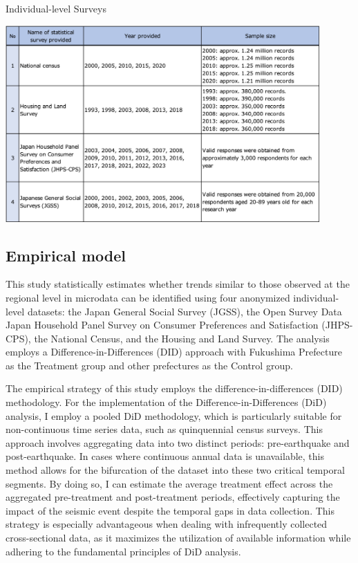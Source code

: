 \documentclass[12pt,halfline,a4paper]{ouparticle}
\begin{document}
\begin{table}[h]
    \centering
    \caption{Individual-level Surveys}
    \label{tab:annual_income}
    \includegraphics[width=0.9\textwidth]{Statistical surveys.png}  %
\end{table}

\subsection{Empirical model}
\label{sec5.1}

This study statistically estimates whether trends similar to those observed at the regional level in microdata can be identified using four anonymized individual-level datasets: the Japan General Social Survey (JGSS), the Open Survey Data Japan Household Panel Survey on Consumer Preferences and Satisfaction (JHPS-CPS), the National Census, and the Housing and Land Survey. The analysis employs a Difference-in-Differences (DID) approach with Fukushima Prefecture as the Treatment group and other prefectures as the Control group.

The empirical strategy of this study employs the difference-in-differences (DID) methodology. For the implementation of the Difference-in-Differences (DiD) analysis, I employ a pooled DiD methodology, which is particularly suitable for non-continuous time series data, such as quinquennial census surveys. This approach involves aggregating data into two distinct periods: pre-earthquake and post-earthquake. In cases where continuous annual data is unavailable, this method allows for the bifurcation of the dataset into these two critical temporal segments. By doing so, I can estimate the average treatment effect across the aggregated pre-treatment and post-treatment periods, effectively capturing the impact of the seismic event despite the temporal gaps in data collection. This strategy is especially advantageous when dealing with infrequently collected cross-sectional data, as it maximizes the utilization of available information while adhering to the fundamental principles of DiD analysis.
\end{document}
